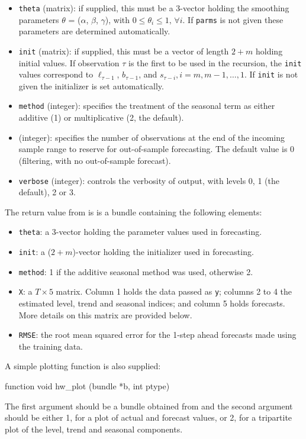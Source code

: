 \documentclass{article}
\begin{document}
\begin{itemize}
\item \texttt{theta} (matrix): if supplied, this must be a 3-vector
  holding the smoothing parameters $\theta$ = ($\alpha$, $\beta$,
  $\gamma$), with $0 \le \theta_i \le 1,\, \forall i$.  If
  \texttt{parms} is not given these parameters are determined
  automatically.
\item \texttt{init} (matrix): if supplied, this must be a vector of
  length $2+m$ holding initial values. If observation $\tau$ is the
  first to be used in the recursion, the \texttt{init} values correspond
  to $\ell_{\tau-1}$, $b_{\tau-1}$, and
  $s_{\tau-i}, i = m, m-1, \dots,1$. If \texttt{init} is not given the
  initializer is set automatically.
\item \texttt{method} (integer): specifies the treatment of the seasonal
  term as either additive (1) or multiplicative (2, the default).
\item {} (integer): specifies the number of observations at
  the end of the incoming sample range to reserve for out-of-sample
  forecasting. The default value is 0 (filtering, with no out-of-sample
  forecast).
\item \texttt{verbose} (integer): controls the verbosity of output, with
  levels 0, 1 (the default), 2 or 3.
\end{itemize}

The return value from  is is a bundle containing the
following elements:
\begin{itemize}
\item \texttt{theta}: a 3-vector holding the parameter values used in
  forecasting.
\item \texttt{init}: a ($2+m$)-vector holding the initializer used in
  forecasting.
\item \texttt{method}: 1 if the additive seasonal method was used,
  otherwise 2.
\item \texttt{X}: a $T \times 5$ matrix.  Column 1 holds the data
  passed as \texttt{y}; columns 2 to 4 the estimated level, trend and
  seasonal indices; and column 5 holds forecasts. More details on this
  matrix are provided below.
\item \texttt{RMSE}: the root mean squared error for the 1-step ahead
  forecasts made using the training data.
\end{itemize}

A simple plotting function is also supplied:
\begin{code}
function void hw_plot (bundle *b, int ptype)
\end{code}
The first argument should be a bundle obtained from 
and the second argument should be either 1, for a plot of actual and
forecast values, or 2, for a tripartite plot of the level, trend and
seasonal components.
\end{document}
